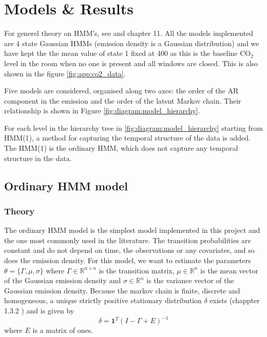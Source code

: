 \section{Models \& Results}
For generel theory on HMM's, see \citep{zucchini2016hidden} and \citep{moler2024statistical} chapter 11. 
All the models implemented are 4 state Gaussian HMMs (emission density is a Gaussian distribution) 
and we have kept the the mean value of state 1 fixed at 400 as this is the baseline $\text{CO}_2$ level in the room 
when no one is present and all windows are closed. This is also shown in the figure \ref{fig:app:co2_data}.

Five models are considered, organised along two axes: the order of the AR
component in the emission and the order of the latent Markov chain. Their
relationship is shown in Figure \ref{fig:diagram:model_hierarchy}.

For each level in the hierarchy tree in \ref{fig:diagram:model_hierarchy} 
starting from HMM(1), a method for capturing the temporal 
structure of the data is added. 
The HMM(1) is the ordinary HMM, 
which does not capture any temporal structure in 
the data.

\newpage

\subsection{Ordinary HMM model}
\subsubsection{Theory}
The ordinary HMM model is the simplest model implemented in this project and the one most commonly used in the literature.
The transition probabilities are constant and do not depend on time, the observations or any covariates, and so does the emission density.
\newline
For this model, we want to estimate the parameters $\theta = \{\Gamma, \mu, \sigma\}$ 
where $\Gamma \in \mathbb{R}^{n \times n}$ is the transition matrix, $\mu \in \mathbb{R}^n$ 
is the mean vector of the Gaussian emission density and $\sigma \in \mathbb{R}^n$ 
is the variance vector of the Gaussian emission density.
Because the markov chain is finite, discrete and homogeneous, 
a unique strictly positive stationary distribution $\delta$ exists 
(chappter 1.3.2 \citep{zucchini2016hidden}) and is given by
\begin{equation}
    \delta=\mathbf{1}^T(I-\Gamma+E)^{-1}
    \label{eq:stationary_dist}
\end{equation}
where $E$ is a matrix of ones. \newline

